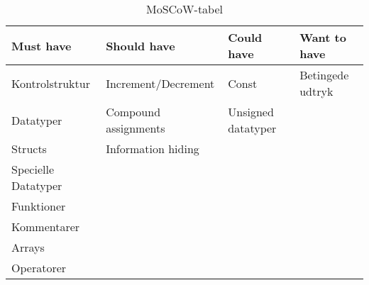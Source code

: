 %
%
\begin{table}[H]
\centering
\begin{tabular}{l|l|l|l}
\toprule
\textbf{Must have} & \textbf{Should have} & \textbf{Could have} & \textbf{Want to have} \\ \midrule
Kontrolstruktur & Increment/Decrement & Const & Betingede udtryk   \\ 
Datatyper & Compound assignments & Unsigned datatyper  & \\ 
Structs & Information hiding &  &	   \\ 
Specielle Datatyper	&  &  &		   \\ 
Funktioner &  &  & 		   \\ 
Kommentarer &  &  & 		   \\ 
Arrays &  &  & 	   \\ 
Operatorer &  &  & 		   \\ \bottomrule
 

 

\end{tabular}
\caption{MoSCoW-tabel}
\label{tab:moscow}
\end{table}


